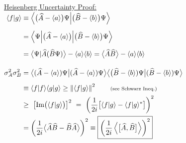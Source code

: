 \documentclass[12pt]{article}
\begin{document}
\vspace{10pt}
\noindent
\begin{minipage}[t]{0.62\textwidth}
    \underline{Heisenberg Uncertainty Proof:} \\[5pt]
    \( \begin{aligned}
        \langle f|g \rangle &\equiv 
            \Big\langle \big( \widehat{A} - \langle a \rangle \big) \Psi 
            \Big| \big( \widehat{B} - \langle b \rangle \big) \Psi \Big\rangle\\[5pt]
        &= \Bigl\langle \Psi \Bigl| \big( \widehat{A} - \langle a \rangle \big) \Bigr|
            \bigl( \widehat{B} - \langle b \rangle \bigr) \Psi \Bigr\rangle\\[5pt]
        &= \big\langle \Psi | \widehat{A} (\widehat{B} \Psi) \big\rangle 
            - \langle a \rangle \langle b \rangle
            = \big\langle \widehat{A}\widehat{B} \big\rangle 
            - \langle a \rangle \langle b \rangle
            \\[10pt]
        \sigma_A^2 \sigma_B^2 &=
            \big\langle ( \widehat{{A}} - \langle {a} \rangle ) {\Psi} 
            \big| ( \widehat{{A}} - \langle {a} \rangle ) {\Psi} \big\rangle 
            \big\langle \big( \widehat{{B}} - \langle {b} \rangle ) {\Psi}
            \big| ( \widehat{{B}} - \langle {b} \rangle ) {\Psi} \big\rangle \\[5pt]
        &\equiv \langle f|f \rangle \langle g|g \rangle 
            \geq \left\Vert \langle f|g \rangle \right\Vert^2 
            \hspace{20pt} \text{\scriptsize(see Schwarz Ineq.)}\\
        &\geq \ \big[ \text{Im} \big( \langle f|g \rangle \big) \big]^2 \ 
            = \ \left( \frac{1}{2i} \big[ \langle f|g \rangle 
            - \langle f|g \rangle^* \big] \right)^2 \\
        &= \left( \frac{1}{2i} \big\langle \widehat{A}\widehat{B} 
            - \widehat{B}\widehat{A} \big\rangle \right)^2 
            \equiv \boxed{ \left( \frac{1}{2i} \left\langle 
            \big[ \widehat{A},\widehat{B} \big] \right\rangle \right)^2 }
    \end{aligned} \)
\end{minipage}
\end{document}

